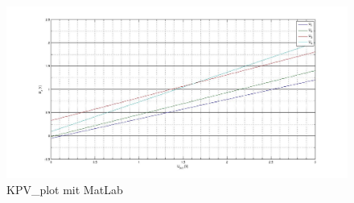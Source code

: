 \documentclass[10pt]{report}
\begin{document}
        \vspace{0.5cm}


        \begin{center}
            \begin{figure}[H]
                \includegraphics[width=\textwidth]{KPV.jpg}
              \caption{KPV\_plot mit MatLab}
            \end{figure}
        \end{center}
\end{document}
